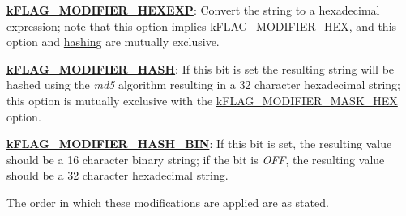 \begin{DoxyItemize}
\begin{DoxyItemize}
\item {\bfseries \hyperlink{}{k\-F\-L\-A\-G\-\_\-\-M\-O\-D\-I\-F\-I\-E\-R\-\_\-\-H\-E\-X\-E\-X\-P}}\-: Convert the string to a hexadecimal expression; note that this option implies \hyperlink{}{k\-F\-L\-A\-G\-\_\-\-M\-O\-D\-I\-F\-I\-E\-R\-\_\-\-H\-E\-X}, and this option and \hyperlink{}{hashing} are mutually exclusive. 
\end{DoxyItemize}
\item {\bfseries \hyperlink{}{k\-F\-L\-A\-G\-\_\-\-M\-O\-D\-I\-F\-I\-E\-R\-\_\-\-H\-A\-S\-H}}\-: If this bit is set the resulting string will be hashed using the {\itshape md5\/} algorithm resulting in a 32 character hexadecimal string; this option is mutually exclusive with the \hyperlink{}{k\-F\-L\-A\-G\-\_\-\-M\-O\-D\-I\-F\-I\-E\-R\-\_\-\-M\-A\-S\-K\-\_\-\-H\-E\-X} option. 
\begin{DoxyItemize}
\item {\bfseries \hyperlink{}{k\-F\-L\-A\-G\-\_\-\-M\-O\-D\-I\-F\-I\-E\-R\-\_\-\-H\-A\-S\-H\-\_\-\-B\-I\-N}}\-: If this bit is set, the resulting value should be a 16 character binary string; if the bit is {\itshape O\-F\-F\/}, the resulting value should be a 32 character hexadecimal string. 
\end{DoxyItemize}
\end{DoxyItemize}

The order in which these modifications are applied are as stated.



